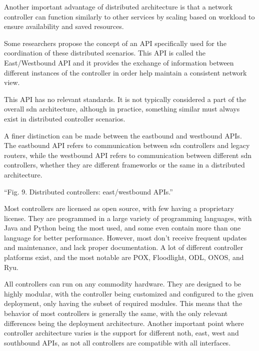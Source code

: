 Another important advantage of distributed architecture is that a network controller can function similarly to other services by scaling based on workload to ensure availability and saved resources. \cite{peterson_software-defined_2021}

Some researchers propose the concept of an API specifically used for the coordination of these distributed scenarios. This API is called the East/Westbound API and it provides the exchange of information between different instances of the controller in order help maintain a consistent network view.\cite{kreutz_software-defined_2015}

This API has no relevant standards\cite{zhu_sdn_2020}. It is not typically considered a part of the overall \gls{sdn} architecture, although in practice, something similar must always exist in distributed controller scenarios.

A finer distinction can be made between the eastbound and westbound APIs. The eastbound API refers to communication between \gls{sdn} controllers and legacy routers, while the westbound API refers to communication between different \gls{sdn} controllers, whether they are different frameworks or the same in a distributed architecture. \cite{kreutz_software-defined_2015}

“Fig. 9. Distributed controllers: east/westbound APIs.” \cite{kreutz_software-defined_2015}

Most controllers are licensed as open source, with few having a proprietary license. They are programmed in a large variety of programming languages, with Java and Python being the most used, and some even contain more than one language for better performance. However, most don’t receive frequent updates and maintenance, and lack proper documentation\cite{zhu_sdn_2020}. A lot of different controller platforms exist, and the most notable are POX, Floodlight, ODL, ONOS, and Ryu\cite{zhu_sdn_2020}. 

All controllers can run on any commodity hardware\cite{kreutz_software-defined_2015}. They are designed to be highly modular, with the controller being customized and configured to the given deployment, only having the subset of required modules\cite{peterson_software-defined_2021}. This means that the behavior of most controllers is generally the same, with the only relevant differences being the deployment architecture. Another important point where controller architecture varies is the support for different noth, east, west and southbound APIs, as not all controllers are compatible with all interfaces. \cite{zhu_sdn_2020}


